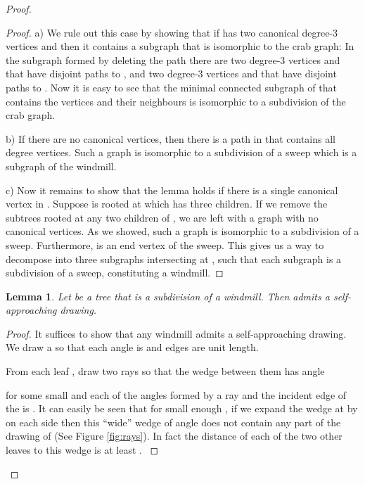\documentclass[11pt]{article}
\newtheorem{lemma}[theorem]{Lemma}
\newcommand{\changeAL}[1]{{#1}}
\newcommand{\changeS}[1]{{#1}}
\begin{document}
\begin{proof}
\begin{proof}
{\changeAL{
a) We rule out this case by showing that if  has two canonical degree-3 vertices  and  then it contains a subgraph that is isomorphic to the crab graph:
In the subgraph formed by deleting the  path there are
two degree-3 vertices  and  that have disjoint paths to , and two degree-3 vertices  and  that have disjoint
paths to .
Now it is easy to see that the minimal connected subgraph of  that contains the vertices  and their neighbours is isomorphic to a subdivision of the crab graph.
}

b) If there are no canonical vertices, then there is a path in  that contains all degree  vertices. Such a graph is isomorphic to a subdivision of a sweep which is a subgraph of the windmill.

c) Now it remains to show that the lemma holds if there is a single canonical vertex  in . Suppose  is rooted at  which has three children. If we remove the subtrees rooted at any two children of , we are left with a graph with no canonical vertices. As we showed, such a graph is isomorphic to a subdivision of a sweep. Furthermore,  is an end vertex of the sweep.  This gives us a way to decompose  into three subgraphs intersecting at , such that each subgraph is a subdivision of a sweep, constituting a windmill.}
\end{proof}

\begin{lemma}
\label{secondlemma}
Let  be a tree that is a subdivision of a windmill.  Then  admits a self-approaching drawing.
\end{lemma}
\begin{proof}
It suffices to show that any windmill admits a self-approaching drawing. We draw a  so that each angle is  and edges are unit length.
\changeAL{From each leaf , draw two rays  so that the  wedge between them has angle

for some small  and each of the angles formed by a ray and the incident edge of the  is
.
It can easily be seen that \changeS{for small enough ,
if we expand the wedge at  by  on each side then this ``wide'' wedge of angle  does not contain any part of the drawing of  (See Figure \ref{fig:rays}).
In fact the distance of each of the two other leaves to this wedge is at least
.
}}



\end{proof}
\end{proof}
\end{document}
